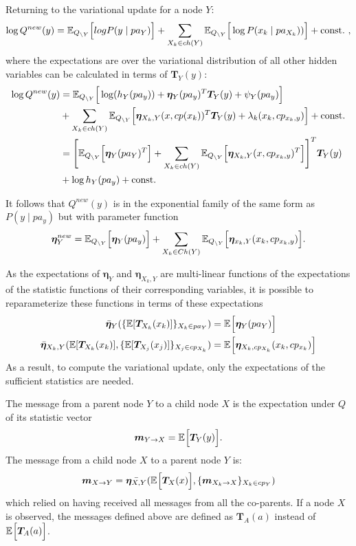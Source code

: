 Returning to the variational update for a node \( Y \):
\[
     \log Q^{new}(y) = \mathbb{E}_{Q_{\backslash Y}}\Big[log P(y \mid pa_Y)\Big] + \sum_{X_k \in ch(Y)}\mathbb{E}_{Q_{\backslash Y}}\Big[\log P(x_k \mid pa_{X_k}))\Big] + \text{const.} \ ,
\]
where the expectations are over the variational distribution of all other hidden variables can be calculated in terms of \( \bm{T}_Y(y) \):
\[
    \begin{aligned}
     \log Q^{new}(y) &= \mathbb{E}_{Q_{\backslash Y}}\Big[\log(h_Y (pa_y)) + \bm{\eta}_Y(pa_y)^T \bm{T}_Y(y) + \psi_Y(pa_y)\Big]\\
     &+ \sum_{X_k \in ch(Y)} \mathbb{E}_{Q_{\backslash Y}}\Big[ \bm{\eta}_{X_k, Y}(x, cp(x_k))^T \bm{T}_Y(y) + \lambda_{k}(x_k, cp_{x_{k},y}) \Big] + \text{const.}\\
     &= \Bigg[ \mathbb{E}_{Q_{\backslash Y}}\Big[\bm{\eta}_Y(pa_Y)^T\Big] + \sum_{X_k \in ch(Y)} \mathbb{E}_{Q_{\backslash Y}}\Big[ \bm{\eta}_{X_k, Y}(x, cp_{x_k,y})^T\Big]  \Bigg]^T \bm{T}_Y(y) \\
     & + \log h_{Y}(pa_y)+ \text{const.}
    \end{aligned}
\]

It follows that \( Q^{new}(y) \) is in the exponential family of the same form as \( P(y \mid pa_y) \) but with parameter function
\[
     \bm{\eta}^{new}_Y = \mathbb{E}_{Q_{\backslash Y}}\Big[\bm{\eta}_Y(pa_y)\Big] + \sum_{X_k \in Ch(Y)}\mathbb{E}_{Q_{\backslash Y}}\Big[\bm{\eta}_{x_k, Y}(x_k, cp_{x_{k},y})\Big].
\]

As the expectations of \( \bm{\eta}_Y \) and \( \bm{\eta}_{X_k, Y} \) are multi-linear functions of the expectations of the statistic functions of their corresponding variables, it is possible to reparameterize these functions in terms of these expectations
\[
     \begin{aligned}
     \bar{\bm{\eta}}_Y (\{ \mathbb{E}[{\bm{T}_{X_k}}(x_k)] \}_{X_k \in pa_Y}) &= \mathbb{E}_{}\Big[\bm{\eta}_Y(pa_Y)\Big]\\
     \bar{\bm{\eta}}_{X_k,Y} (  \mathbb{E}[\bm{T}_{X_k}(x_k)], \{ \mathbb{E}[{\bm{T}_{X_j}}(x_j)] \}_{X_j \in cp_{X_k}}) &= \mathbb{E}_{}\Big[\bm{\eta}_{X_k, cp_{X_k}}(x_k, cp_{x_k})\Big]\\
     \end{aligned}
\]
As a result, to compute the variational update, only the expectations of the sufficient statistics are needed.

The message from a parent node \( Y \) to a child node \( X \) is the expectation under \( Q \) of its statistic vector
\[
      \bm{m}_{Y \to X} = \mathbb{E}_{}\Big[\bm{T}_Y(y)\Big].
\]
The message from a child node \( X \) to a parent node \( Y \) is:
\[
      \bm{m}_{X \to Y} = \bar{\bm{\eta}_{X,Y}}(\mathbb{E}_{}\Big[\bm{T}_X(x)\Big], \{\bm{m}_{X_k \to X}\}_{X_k\in cp_Y})
\]
which relied on having received all messages from all the co-parents. If a node \( X \)  is observed, the messages defined above are defined as \( \bm{T}_A(a) \) instead of \( \mathbb{E}_{}\Big[\bm{T}_A(a)\Big] \).

